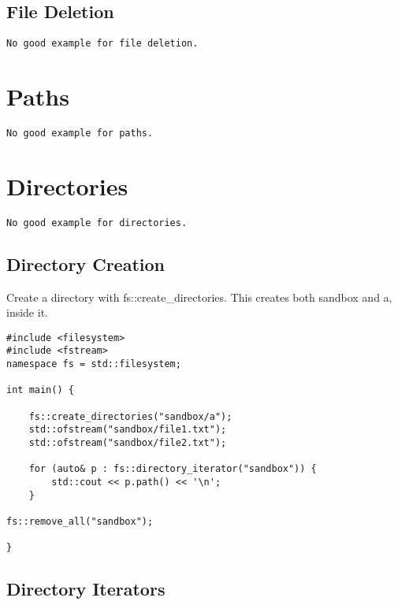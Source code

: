 \subsection{File Deletion}
\begin{verbatim}
No good example for file deletion.
\end{verbatim}


\section{Paths}

\begin{verbatim}
No good example for paths.
\end{verbatim}

\section{Directories}

\begin{verbatim}
No good example for directories.
\end{verbatim}

\subsection{Directory Creation}

Create a directory with fs::create\_directories. This creates both sandbox and a, inside it.

\begin{verbatim}
#include <filesystem>
#include <fstream>
namespace fs = std::filesystem;

int main() {

    fs::create_directories("sandbox/a");
    std::ofstream("sandbox/file1.txt");
    std::ofstream("sandbox/file2.txt");

    for (auto& p : fs::directory_iterator("sandbox")) {
        std::cout << p.path() << '\n';
    } 

fs::remove_all("sandbox");

}
\end{verbatim}

\subsection{Directory Iterators}

